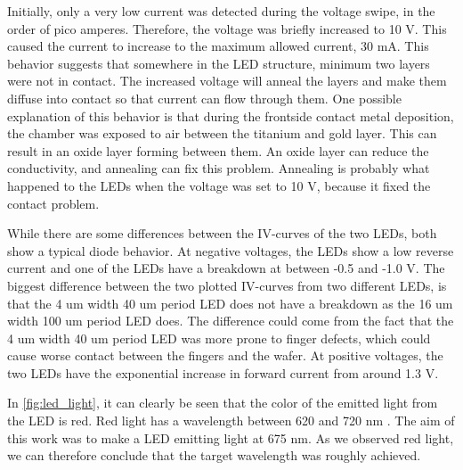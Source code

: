 \noindent Initially, only a very low current was detected during the voltage swipe, in the order of pico amperes.
Therefore, the voltage was briefly increased to 10 V.
This caused the current to increase to the maximum allowed current, 30 mA.
This behavior suggests that somewhere in the LED structure, minimum two layers were not in contact.
The increased voltage will anneal the layers and make them diffuse into contact so that current can flow through them.
One possible explanation of this behavior is that during the frontside contact metal deposition, the chamber was exposed to air between the titanium and gold layer.
This can result in an oxide layer forming between them.
An oxide layer can reduce the conductivity, and annealing can fix this problem. 
Annealing is probably what happened to the LEDs when the voltage was set to 10 V, because it fixed the contact problem.

While there are some differences between the IV-curves of the two LEDs, both show a typical diode behavior.
At negative voltages, the LEDs show a low reverse current and one of the LEDs have a breakdown at between -0.5 and -1.0 V.
The biggest difference between the two plotted IV-curves from two different LEDs, is that the 4 um width 40 um period LED does not have a breakdown as the 16 um width 100 um period LED does.
The difference could come from the fact that the 4 um width 40 um period LED was more prone to finger defects, which could cause worse contact between the fingers and the wafer. 
At positive voltages, the two LEDs have the exponential increase in forward current from around 1.3 V.

In \autoref{fig:led_light}, it can clearly be seen that the color of the emitted light from the LED is red.
Red light has a wavelength between 620 and 720 nm \cite{red_light}.
The aim of this work was to make a LED emitting light at 675 nm.
As we observed red light, we can therefore conclude that the target wavelength was roughly achieved.
